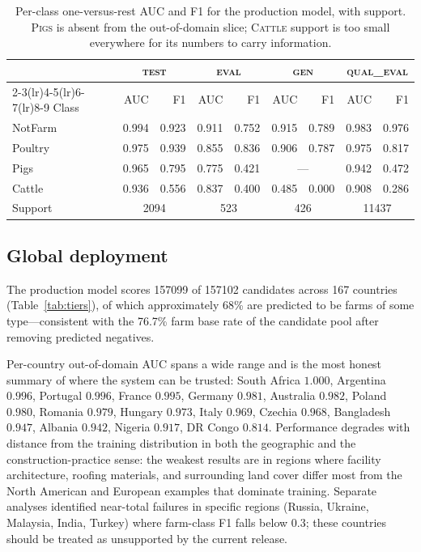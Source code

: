 \documentclass[11pt,a4paper]{article}
\begin{document}
\begin{table}[t]
\centering
\small
\caption{Per-class one-versus-rest AUC and F1 for the production model, with
support. \textsc{Pigs} is absent from the out-of-domain slice; \textsc{Cattle}
support is too small everywhere for its numbers to carry information.}
\label{tab:perclass}
\begin{tabular}{lrrrrrrrr}
\toprule
& \multicolumn{2}{c}{\textsc{test}} & \multicolumn{2}{c}{\textsc{eval}}
& \multicolumn{2}{c}{\textsc{gen}} & \multicolumn{2}{c}{\textsc{qual\_eval}} \\
\cmidrule(lr){2-3}\cmidrule(lr){4-5}\cmidrule(lr){6-7}\cmidrule(lr){8-9}
Class & AUC & F1 & AUC & F1 & AUC & F1 & AUC & F1 \\
\midrule
NotFarm & 0.994 & 0.923 & 0.911 & 0.752 & 0.915 & 0.789 & 0.983 & 0.976 \\
Poultry & 0.975 & 0.939 & 0.855 & 0.836 & 0.906 & 0.787 & 0.975 & 0.817 \\
Pigs    & 0.965 & 0.795 & 0.775 & 0.421 & \multicolumn{2}{c}{---} & 0.942 & 0.472 \\
Cattle  & 0.936 & 0.556 & 0.837 & 0.400 & 0.485 & 0.000 & 0.908 & 0.286 \\
\midrule
Support & \multicolumn{2}{c}{\num{2094}} & \multicolumn{2}{c}{523}
        & \multicolumn{2}{c}{426} & \multicolumn{2}{c}{\num{11437}} \\
\bottomrule
\end{tabular}
\end{table}

\subsection{Global deployment}
\label{sec:deployment}

The production model scores \num{157099} of \num{157102} candidates across 167
countries (Table~\ref{tab:tiers}), of which approximately 68\% are predicted to
be farms of some type---consistent with the 76.7\% farm base rate of the
candidate pool after removing predicted negatives.

Per-country out-of-domain AUC spans a wide range and is the most honest summary
of where the system can be trusted: South Africa $1.000$, Argentina $0.996$,
Portugal $0.996$, France $0.995$, Germany $0.981$, Australia $0.982$, Poland
$0.980$, Romania $0.979$, Hungary $0.973$, Italy $0.969$, Czechia $0.968$,
Bangladesh $0.947$, Albania $0.942$, Nigeria $0.917$, DR Congo $0.814$.
Performance degrades with distance from the training distribution in both the
geographic and the construction-practice sense: the weakest results are in
regions where facility architecture, roofing materials, and surrounding land
cover differ most from the North American and European examples that dominate
training. Separate analyses identified near-total failures in specific regions
(Russia, Ukraine, Malaysia, India, Turkey) where farm-class F1 falls below
$0.3$; these countries should be treated as unsupported by the current release.
\end{document}

